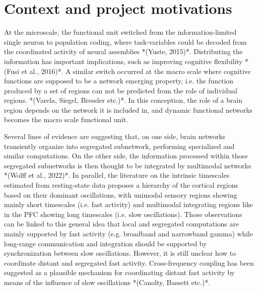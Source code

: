 \documentclass[a4paper,11pt]{article}
\begin{document}


\section{Context and project motivations}

At the microscale, the functional unit switched from the information-limited single neuron to population coding, where task-variables could be decoded from the coordinated activity of neural assemblies *(Yuste, 2015)*. Distributing the information has important implications, such as improving cognitive flexibility *(Fusi et al., 2016)*. A similar switch occurred at the macro scale where cognitive functions are supposed to be a network emerging property, i.e. the function produced by a set of regions can not be predicted from the role of individual regions. *(Varela, Siegel, Bressler etc.)*. In this conception, the role of a brain region depends on the network it is included in, and dynamic functional networks becomes the macro scale functional unit. 

Several lines of evidence are suggesting that, on one side, brain networks transiently organize into segregated subnetwork, performing specialized and similar computations. On the other side, the information processed within those segregated subnetworks is then thought to be integrated by multimodal networks *(Wolff et al., 2022)*. In parallel, the literature on the intrinsic timescales estimated from resting-state data proposes a hierarchy of the cortical regions based on their dominant oscillations, with unimodal sensory regions showing mainly short timescales (i.e. fast activity) and multimodal integrating regions like in the PFC showing long timescales (i.e. slow oscillations). Those observations can be linked to this general idea that local and segregated computations are mainly supported by fast activity (e.g. broadband and narrowband gamma) while long-range communication and integration should be supported by synchronization between slow oscillations. However, it is still unclear how to coordinate distant and segregated fast activity. Cross-frequency coupling has been suggested as a plausible mechanism for coordinating distant fast activity by means of the influence of slow oscillations *(Canolty, Bassett etc.)*.
\end{document}
